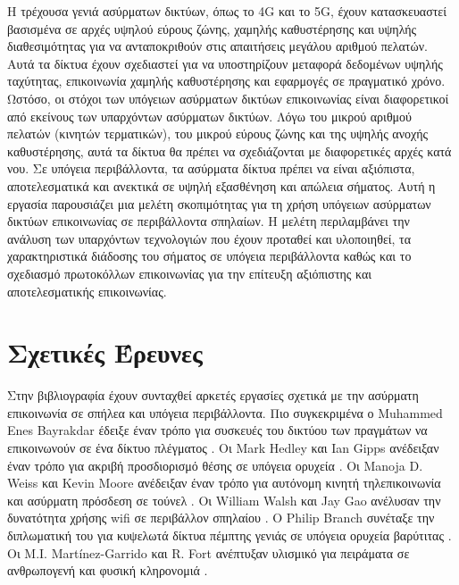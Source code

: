 \documentclass[12pt]{article}
\begin{document}
\begin{multicols*}{2}
        Η τρέχουσα γενιά ασύρματων δικτύων, όπως το 4G και το 5G, έχουν κατασκευαστεί
        βασισμένα σε αρχές υψηλού εύρους ζώνης, χαμηλής καθυστέρησης και υψηλής
        διαθεσιμότητας για να ανταποκριθούν στις απαιτήσεις μεγάλου αριθμού πελατών. Αυτά
        τα δίκτυα έχουν σχεδιαστεί για να υποστηρίζουν μεταφορά δεδομένων υψηλής
        ταχύτητας, επικοινωνία χαμηλής καθυστέρησης και εφαρμογές σε πραγματικό χρόνο.
        Ωστόσο, οι στόχοι των υπόγειων ασύρματων δικτύων επικοινωνίας είναι διαφορετικοί
        από εκείνους των υπαρχόντων ασύρματων δικτύων. Λόγω του μικρού αριθμού πελατών
        (κινητών τερματικών), του μικρού εύρους ζώνης και της υψηλής ανοχής καθυστέρησης,
        αυτά τα δίκτυα θα πρέπει να σχεδιάζονται με διαφορετικές αρχές κατά νου. Σε
        υπόγεια περιβάλλοντα, τα ασύρματα δίκτυα πρέπει να είναι αξιόπιστα, αποτελεσματικά
        και ανεκτικά σε υψηλή εξασθένηση και απώλεια σήματος.
        Αυτή η εργασία παρουσιάζει μια μελέτη σκοπιμότητας για τη χρήση υπόγειων ασύρματων
        δικτύων επικοινωνίας σε περιβάλλοντα σπηλαίων. Η μελέτη περιλαμβάνει την ανάλυση
        των υπαρχόντων τεχνολογιών που έχουν προταθεί και υλοποιηθεί, τα χαρακτηριστικά
        διάδοσης του σήματος σε υπόγεια περιβάλλοντα καθώς και το σχεδιασμό πρωτοκόλλων
        επικοινωνίας για την επίτευξη αξιόπιστης και αποτελεσματικής επικοινωνίας.

    \section{\normalsize \textsf{Σχετικές Έρευνες}} Στην βιβλιογραφία έχουν συνταχθεί
        αρκετές εργασίες σχετικά με την ασύρματη επικοινωνία σε σπήλεα και υπόγεια
        περιβάλλοντα. Πιο συγκεκριμένα ο Muhammed Enes Bayrakdar έδειξε έναν τρόπο για
        συσκευές του δικτύου των πραγμάτων να επικοινωνούν σε ένα δίκτυο πλέγματος
        \cite{bayrakdar_rule_2019}. Οι Mark Hedley και Ian Gipps ανέδειξαν έναν τρόπο για
        ακριβή προσδιορισμό θέσης σε υπόγεια ορυχεία \cite{hedley_accurate_2013}. Οι
        Manoja D. Weiss και Kevin Moore ανέδειξαν έναν τρόπο για αυτόνομη κινητή
        τηλεπικοινωνία και ασύρματη πρόσδεση σε τούνελ \cite{weiss_autonomous_2009}. Οι
        William Walsh και Jay Gao ανέλυσαν την δυνατότητα χρήσης wifi σε περιβάλλον
        σπηλαίου \cite{walsh_communications_2018}. Ο Philip Branch συνέταξε την
        διπλωματική του για κυψελωτά δίκτυα πέμπτης γενιάς σε υπόγεια ορυχεία βαρύτιτας
        \cite{branch_fifth_2021}. Οι M.I. Martínez-Garrido και R. Fort ανέπτυξαν υλισμικό
        για πειράματα σε ανθρωπογενή και φυσική κληρονομιά
        \cite{martinez-garrido_experimental_2016}.


\end{multicols*}
\end{document}
